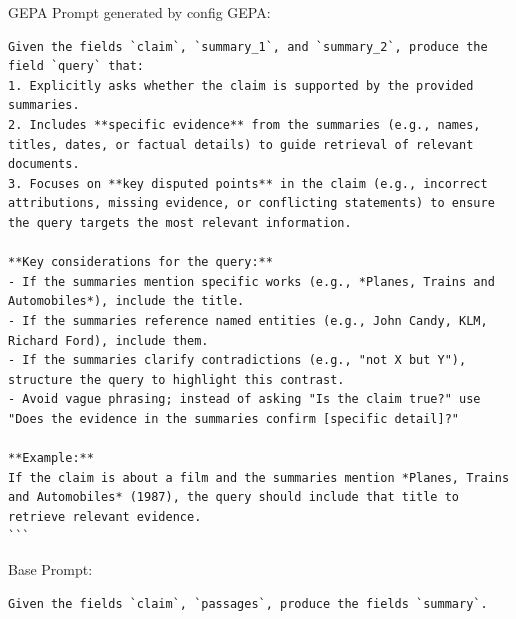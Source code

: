 \begin{instructbox}
\begin{lstlisting}[breakindent=0pt, breaklines=true, breakatwhitespace=true, frame=single, backgroundcolor=\color{green!10}]
\end{lstlisting}

GEPA Prompt generated by config GEPA:
\begin{lstlisting}[breakindent=0pt, breaklines=true, breakatwhitespace=true, frame=single, backgroundcolor=\color{blue!10}]
Given the fields `claim`, `summary_1`, and `summary_2`, produce the field `query` that:  
1. Explicitly asks whether the claim is supported by the provided summaries.  
2. Includes **specific evidence** from the summaries (e.g., names, titles, dates, or factual details) to guide retrieval of relevant documents.  
3. Focuses on **key disputed points** in the claim (e.g., incorrect attributions, missing evidence, or conflicting statements) to ensure the query targets the most relevant information.  

**Key considerations for the query:**  
- If the summaries mention specific works (e.g., *Planes, Trains and Automobiles*), include the title.  
- If the summaries reference named entities (e.g., John Candy, KLM, Richard Ford), include them.  
- If the summaries clarify contradictions (e.g., "not X but Y"), structure the query to highlight this contrast.  
- Avoid vague phrasing; instead of asking "Is the claim true?" use "Does the evidence in the summaries confirm [specific detail]?"  

**Example:**  
If the claim is about a film and the summaries mention *Planes, Trains and Automobiles* (1987), the query should include that title to retrieve relevant evidence.  
```
\end{lstlisting}
\end{instructbox}\begin{instructbox}
Base Prompt:
\begin{lstlisting}[breakindent=0pt, breaklines=true, breakatwhitespace=true, frame=single, backgroundcolor=\color{gray!10}]
Given the fields `claim`, `passages`, produce the fields `summary`.
\end{lstlisting}


\end{instructbox}
